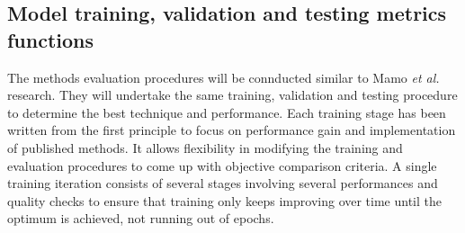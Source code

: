 \subsection{Model training, validation and testing metrics functions} \label{subsec:t_model}
%
The methods evaluation procedures will be connducted similar to Mamo \textit{et al.}~\cite{mamo_long_2020} research.
They will undertake the same training, validation and testing procedure to determine the best technique and performance.
Each training stage has been written from the first principle to focus on performance gain and implementation of published methods.
It allows flexibility in modifying the training and evaluation procedures to come up with objective comparison criteria.
A single training iteration consists of several stages involving several performances and quality checks to ensure that training only keeps improving over time until the optimum is achieved, not running out of epochs.

